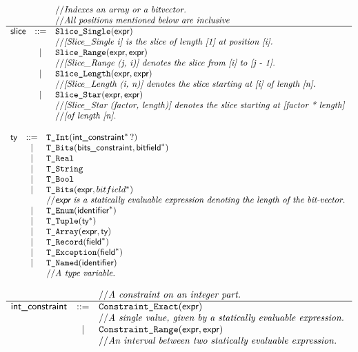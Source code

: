 \documentclass{book}
\begin{document}
\[
\begin{array}{rcl}
&&// \textit{Indexes an array or a bitvector.}\ \\
&&// \textit{All positions mentioned below are inclusive}\ \\
\hline
\textsf{slice} &::=& \texttt{Slice\_Single} (\textsf{expr}) \\
  & & // \textit{[Slice\_Single i] is the slice of length [1] at position [i].}\ \\
  &|& \texttt{Slice\_Range}(\textsf{expr}, \textsf{expr}) \\
  & & // \textit{[Slice\_Range (j, i)] denotes the slice from [i] to [j - 1].}\ \\
  &|& \texttt{Slice\_Length}(\textsf{expr}, \textsf{expr}) \\
  & & // \textit{[Slice\_Length (i, n)] denotes the slice starting at [i] of length
          [n].}\ \\
  &|& \texttt{Slice\_Star}(\textsf{expr}, \textsf{expr}) \\
  & & // \textit{[Slice\_Star (factor, length)] denotes the slice starting at [factor
          * length]}\ \\
  & & // \textit{[of length [n].}\ \\
\end{array}
\]

\[
\begin{array}{rcl}
\textsf{ty} &::=& \texttt{T\_Int}(\textsf{int\_constraint}^*\,?) \\
  &|& \texttt{T\_Bits}(\textsf{bits\_constraint}, \textsf{bitfield}^{*}) \\
  &|& \texttt{T\_Real} \\
  &|& \texttt{T\_String} \\
  &|& \texttt{T\_Bool} \\
  &|& \texttt{T\_Bits}(\textsf{expr}, bitfield^{*}) \\
  & & // \textit{\textsf{expr}\ is a statically evaluable expression denoting the length of the bit-vector.}\ \\
  &|& \texttt{T\_Enum}(\textsf{identifier}^{*}) \\
  &|& \texttt{T\_Tuple}(\textsf{ty}^{*}) \\
  &|& \texttt{T\_Array}(\textsf{expr}, \textsf{ty}) \\
  &|& \texttt{T\_Record}(\textsf{field}^{*}) \\
  &|& \texttt{T\_Exception}(\textsf{field}^{*}) \\
  &|& \texttt{T\_Named}(\textsf{identifier})\\
  & & // \textit{A type variable.}\ \\
\end{array}
\]

\[
\begin{array}{rcl}
& & // \textit{A constraint on an integer part.}\ \\
\hline
\textsf{int\_constraint} &::=& \texttt{Constraint\_Exact}(\textsf{expr}) \\
  & & // \textit{A single value, given by a statically evaluable expression.}\ \\
  &|& \texttt{Constraint\_Range}(\textsf{expr}, \textsf{expr}) \\
  & & // \textit{An interval between two statically evaluable expression.}\ \\
\end{array}
\]
\end{document}

